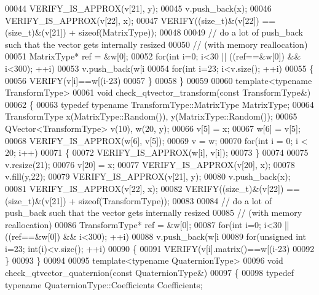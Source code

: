 \begin{DoxyCode}
00044   VERIFY\_IS\_APPROX(v[21], y);
00045   v.push\_back(x);
00046   VERIFY\_IS\_APPROX(v[22], x);
00047   VERIFY((\textcolor{keywordtype}{size\_t})&(v[22]) == (\textcolor{keywordtype}{size\_t})&(v[21]) + \textcolor{keyword}{sizeof}(MatrixType));
00048 
00049   \textcolor{comment}{// do a lot of push\_back such that the vector gets internally resized}
00050   \textcolor{comment}{// (with memory reallocation)}
00051   MatrixType* ref = &w[0];
00052   \textcolor{keywordflow}{for}(\textcolor{keywordtype}{int} i=0; i<30 || ((ref==&w[0]) && i<300); ++i)
00053     v.push\_back(w[i%
00054   \textcolor{keywordflow}{for}(\textcolor{keywordtype}{int} i=23; i<v.size(); ++i)
00055   \{
00056     VERIFY(v[i]==w[(i-23)%
00057   \}
00058 \}
00059 
00060 \textcolor{keyword}{template}<\textcolor{keyword}{typename} TransformType>
00061 \textcolor{keywordtype}{void} check\_qtvector\_transform(\textcolor{keyword}{const} TransformType&)
00062 \{
00063   \textcolor{keyword}{typedef} \textcolor{keyword}{typename} TransformType::MatrixType MatrixType;
00064   TransformType x(MatrixType::Random()), y(MatrixType::Random());
00065   QVector<TransformType> v(10), w(20, y);
00066   v[5] = x;
00067   w[6] = v[5];
00068   VERIFY\_IS\_APPROX(w[6], v[5]);
00069   v = w;
00070   \textcolor{keywordflow}{for}(\textcolor{keywordtype}{int} i = 0; i < 20; i++)
00071   \{
00072     VERIFY\_IS\_APPROX(w[i], v[i]);
00073   \}
00074 
00075   v.resize(21);
00076   v[20] = x;
00077   VERIFY\_IS\_APPROX(v[20], x);
00078   v.fill(y,22);
00079   VERIFY\_IS\_APPROX(v[21], y);
00080   v.push\_back(x);
00081   VERIFY\_IS\_APPROX(v[22], x);
00082   VERIFY((\textcolor{keywordtype}{size\_t})&(v[22]) == (\textcolor{keywordtype}{size\_t})&(v[21]) + \textcolor{keyword}{sizeof}(TransformType));
00083 
00084   \textcolor{comment}{// do a lot of push\_back such that the vector gets internally resized}
00085   \textcolor{comment}{// (with memory reallocation)}
00086   TransformType* ref = &w[0];
00087   \textcolor{keywordflow}{for}(\textcolor{keywordtype}{int} i=0; i<30 || ((ref==&w[0]) && i<300); ++i)
00088     v.push\_back(w[i%
00089   \textcolor{keywordflow}{for}(\textcolor{keywordtype}{unsigned} \textcolor{keywordtype}{int} i=23; int(i)<v.size(); ++i)
00090   \{
00091     VERIFY(v[i].matrix()==w[(i-23)%
00092   \}
00093 \}
00094 
00095 \textcolor{keyword}{template}<\textcolor{keyword}{typename} QuaternionType>
00096 \textcolor{keywordtype}{void} check\_qtvector\_quaternion(\textcolor{keyword}{const} QuaternionType&)
00097 \{
00098   \textcolor{keyword}{typedef} \textcolor{keyword}{typename} QuaternionType::Coefficients Coefficients;

\end{DoxyCode}

